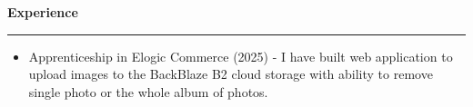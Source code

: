 {
    {\vspace{0.5cm} \hspace{-0.5cm} \Large \textbf{Experience}}
    \par\noindent\rule{\textwidth}{0.1mm}
    \begin{itemize}
        \item Apprenticeship in Elogic Commerce (2025) - 
        I have built web application to upload images to the BackBlaze B2 cloud storage with ability to remove single photo or the whole album of photos.
    \end{itemize}
}
